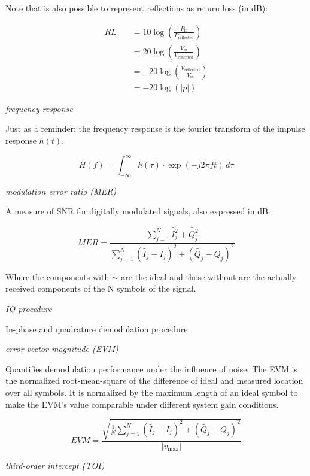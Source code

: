 \documentclass{article}
\begin{document}
Note that is also possible to represent reflections as return loss (in dB):

\begin{align*}
	RL \quad 	&= 10 	\log\left(\frac{P_\text{in}}{P_\text{reflected}}\right) 	\\
				&= 20 	\log\left(\frac{V_\text{in}}{V_\text{reflected}}\right) 	\\
				&= -20 	\log\left(\frac{V_\text{reflected}}{V_\text{in}}\right) 	\\
				&= -20 	\log\left(\lvert p \rvert\right)
\end{align*}
	


\bigskip

\emph{frequency response}

Just as a reminder: the frequency response is the fourier transform of the impulse response $h(t)$.

$$
	H(f) = \int_{-\infty}^{\infty} h(\tau) \cdot \exp(-j2\pi ft) \,d\tau
$$

\bigskip
 
\emph{modulation error ratio (MER)}

A measure of SNR for digitally modulated signals, also expressed in dB.

$$
	MER = \frac{\sum_{j=1}^{N} \tilde{I_j^2}+\tilde{Q_j^2}}{\sum_{j=1}^{N} (\tilde{I_j}-I_j)^2+(\tilde{Q_j}-Q_j)^2}
$$

Where the components with $\sim$ are the ideal and those without are the actually received components of the N symbols of the signal.

\bigskip

\emph{IQ procedure}

In-phase and quadrature demodulation procedure. 

\bigskip

\emph{error vector magnitude (EVM)}

Quantifies demodulation performance under the influence of noise. The EVM is the normalized root-mean-square of the difference of ideal and measured location over all symbols. It is normalized by the maximum length of an ideal symbol to make the EVM's value comparable under different system gain conditions.

$$
	EVM = \frac{\sqrt{\frac{1}{N}\sum_{j=1}^{N} (\tilde{I_j}-I_j)^2+(\tilde{Q_j}-Q_j)^2 }}{\lvert v_\text{max} \rvert}
$$

\bigskip

\emph{third-order intercept (TOI)}
\end{document}
